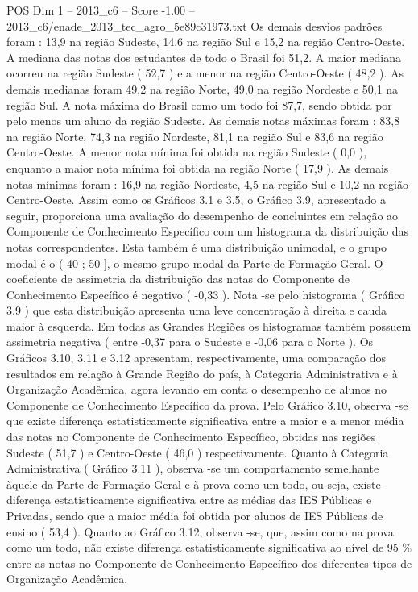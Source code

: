 \begin{textsample}{POS Dim 1 – 2013\_c6 – Score -1.00 – 2013\_c6/enade\_2013\_tec\_agro\_5e89c31973.txt}
Os demais desvios padrões foram : 13,9 na região Sudeste, 14,6 na região Sul e 15,2 na região Centro-Oeste.
A mediana das notas dos estudantes de todo o Brasil foi 51,2.
A maior mediana ocorreu na região Sudeste ( 52,7 ) e a menor na região Centro-Oeste ( 48,2 ).
As demais medianas foram 49,2 na região Norte, 49,0 na região Nordeste e 50,1 na região Sul.
A nota máxima do Brasil como um todo foi 87,7, sendo obtida por pelo menos um aluno da região Sudeste.
As demais notas máximas foram : 83,8 na região Norte, 74,3 na região Nordeste, 81,1 na região Sul e 83,6 na região Centro-Oeste.
A menor nota mínima foi obtida na região Sudeste ( 0,0 ), enquanto a maior nota mínima foi obtida na região Norte ( 17,9 ).
As demais notas mínimas foram : 16,9 na região Nordeste, 4,5 na região Sul e 10,2 na região Centro-Oeste.
Assim como os Gráficos 3.1 e 3.5, o Gráfico 3.9, apresentado a seguir, proporciona uma avaliação do desempenho de concluintes em relação ao Componente de Conhecimento Específico com um histograma da distribuição das notas correspondentes.
Esta também é uma distribuição unimodal, e o grupo modal é o ( 40 ; 50 ], o mesmo grupo modal da Parte de Formação Geral.
O coeficiente de assimetria da distribuição das notas do Componente de Conhecimento Específico é negativo ( -0,33 ).
Nota -se pelo histograma ( Gráfico 3.9 ) que esta distribuição apresenta uma leve concentração à direita e cauda maior à esquerda.
Em todas as Grandes Regiões os histogramas também possuem assimetria negativa ( entre -0,37 para o Sudeste e -0,06 para o Norte ).
Os Gráficos 3.10, 3.11 e 3.12 apresentam, respectivamente, uma comparação dos resultados em relação à Grande Região do país, à Categoria Administrativa e à Organização Acadêmica, agora levando em conta o desempenho de alunos no Componente de Conhecimento Específico da prova.
Pelo Gráfico 3.10, observa -se que existe diferença estatisticamente significativa entre a maior e a menor média das notas no Componente de Conhecimento Específico, obtidas nas regiões Sudeste ( 51,7 ) e Centro-Oeste ( 46,0 ) respectivamente.
Quanto à Categoria Administrativa ( Gráfico 3.11 ), observa -se um comportamento semelhante àquele da Parte de Formação Geral e à prova como um todo, ou seja, existe diferença estatisticamente significativa entre as médias das IES Públicas e Privadas, sendo que a maior média foi obtida por alunos de IES Públicas de ensino ( 53,4 ).
Quanto ao Gráfico 3.12, observa -se, que, assim como na prova como um todo, não existe diferença estatisticamente significativa ao nível de 95 \% entre as notas no Componente de Conhecimento Específico dos diferentes tipos de Organização Acadêmica.

\end{textsample}
